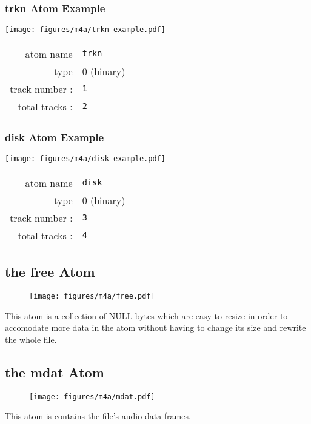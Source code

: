 \subsubsection{trkn Atom Example}
\texttt{[image: figures/m4a/trkn-example.pdf]}
\par
\noindent
\begin{tabular}{rl}
  \textsf{atom name} & \texttt{trkn} \\
  \textsf{type} & 0 (binary) \\
  \textsf{track number} : & \texttt{1} \\
  \textsf{total tracks} : & \texttt{2} \\
\end{tabular}

\subsubsection{disk Atom Example}
\texttt{[image: figures/m4a/disk-example.pdf]}
\par
\noindent
\begin{tabular}{rl}
  \textsf{atom name} & \texttt{disk} \\
  \textsf{type} & 0 (binary) \\
  \textsf{track number} : & \texttt{3} \\
  \textsf{total tracks} : & \texttt{4} \\
\end{tabular}

\clearpage

\subsection{the free Atom}
\label{atom:free}
\begin{figure}[h]
  \texttt{[image: figures/m4a/free.pdf]}
\end{figure}
\par
\noindent
This atom is a collection of NULL bytes which are easy
to resize in order to accomodate more data
in the  atom without having to change
its size and rewrite the whole file.

\subsection{the mdat Atom}
\begin{figure}[h]
  \texttt{[image: figures/m4a/mdat.pdf]}
\end{figure}
\par
\noindent
This atom is contains the file's audio data frames.
